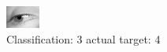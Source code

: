 \begin{figure}[h!]
\begin{center}
\includegraphics[width=0.60\columnwidth]{figures/ID2999_class_3_target_4.png}
\end{center}
\caption{ Classification: 3 actual target: 4}
\label{fig:ID2999_class_3_target_4}
\end{figure}
